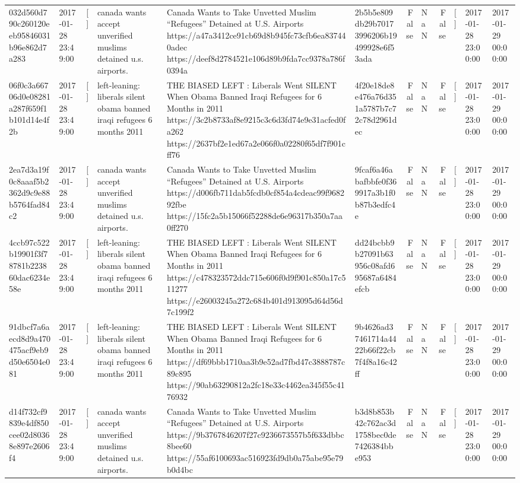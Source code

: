 \begin{tabular}{llllllrlrlll}
032d560d790c260120eeb95846031b96e862d7a283 & 2017-01-28 23:49:00 & [] & canada wants accept unverified muslims detained u.s. airports. & Canada Wants to Take Unvetted Muslim “Refugees” Detained at U.S. Airports https://a47a3412ce91cb69d8b945fc73cfb6ea837440adec https://deef8d2784521e106d89b9fda7cc9378a786f0394a & 2b5b5e809db29b70173996206b19499928e6f53ada & False & NaN & False & [] & 2017-01-28 23:00:00 & 2017-01-29 00:00:00 \\
06f0c3a66706d0e08281a287f659f1b101d14e4f2b & 2017-01-28 23:49:00 & [] & left-leaning: liberals silent obama banned iraqi refugees 6 months 2011 & THE BIASED LEFT : Liberals Went SILENT When Obama Banned Iraqi Refugees for 6 Months in 2011 https://3c2b8733af8e9215c3c6d3fd74e9e31acfed0fa262 https://2637bf2e1ed67a2e066f0a02280f65df7f901cff76 & 4f20e18de8e476a76d351a5787b7c72c78d2961dec & False & NaN & False & [] & 2017-01-28 23:00:00 & 2017-01-29 00:00:00 \\
2ea7d3a19f0c8aaaf5b2362d9c9e88b5764fad84c2 & 2017-01-28 23:49:00 & [] & canada wants accept unverified muslims detained u.s. airports. & Canada Wants to Take Unvetted Muslim “Refugees” Detained at U.S. Airports https://d006fb711dab5fcdb0cf854a4cdeac99f968292fbe https://15fc2a5b15066f52288de6e96317b350a7aa0ff270 & 9fcaf6a46abafbbfe0f369917a3b1f0b87b3edfc4e & False & NaN & False & [] & 2017-01-28 23:00:00 & 2017-01-29 00:00:00 \\
4ccb97c522b19901f3f78781b223860dac6234e58e & 2017-01-28 23:49:00 & [] & left-leaning: liberals silent obama banned iraqi refugees 6 months 2011 & THE BIASED LEFT : Liberals Went SILENT When Obama Banned Iraqi Refugees for 6 Months in 2011 https://c478323572ddc715e606f0d9f901c850a17c511277 https://e26003245a272c684b401d913095d64d56d7c199f2 & dd24bcbb9b27091b63956c08afd695687a6484efcb & False & NaN & False & [] & 2017-01-28 23:00:00 & 2017-01-29 00:00:00 \\
91dbcf7a6aecd8d9a470475acf9eb9d50e6504e081 & 2017-01-28 23:49:00 & [] & left-leaning: liberals silent obama banned iraqi refugees 6 months 2011 & THE BIASED LEFT : Liberals Went SILENT When Obama Banned Iraqi Refugees for 6 Months in 2011 https://df69bbb1710aa3b9e52ad7fbd47c3888787c89c895 https://90ab63290812a2fc18e33c4462ea345f55c4176932 & 9b4626ad37461714a4422b66f22cb7f4f8a16c42ff & False & NaN & False & [] & 2017-01-28 23:00:00 & 2017-01-29 00:00:00 \\
d14f732cf9839e4df850cee02d80368e897e2606f4 & 2017-01-28 23:49:00 & [] & canada wants accept unverified muslims detained u.s. airports. & Canada Wants to Take Unvetted Muslim “Refugees” Detained at U.S. Airports https://9b3767846207f27c9236673557b5f633dbbc8bee60 https://55af6100693ac516923fd9db0a75abe95e79b0d4bc & b3d8b853b42c762ac3d1758bec0de7426384bbe953 & False & NaN & False & [] & 2017-01-28 23:00:00 & 2017-01-29 00:00:00 \\

\end{tabular}
